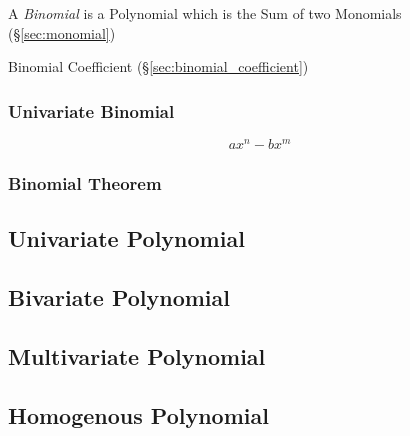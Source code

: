 A \emph{Binomial} is a Polynomial which is the Sum of two Monomials
(\S\ref{sec:monomial})

Binomial Coefficient (\S\ref{sec:binomial_coefficient})



\subsubsection{Univariate Binomial}\label{sec:univariate_binomial}

\[
  a x^n - b x^m
\]


\subsubsection{Binomial Theorem}\label{sec:binomial_theorem}



\subsection{Univariate Polynomial}\label{sec:univariate_polynomial}

\subsection{Bivariate Polynomial}\label{sec:bivariate_polynomial}

\subsection{Multivariate Polynomial}\label{sec:multivariate_polynomial}

\subsection{Homogenous Polynomial}\label{sec:homogenous_polynomial}

